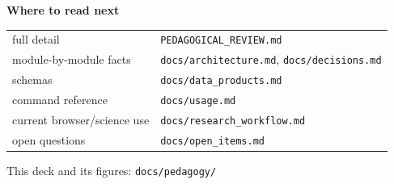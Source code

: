 \documentclass[aspectratio=169,11pt]{beamer}
\newcommand{\currevsec}{}
\newcommand{\revsec}[1]{\gdef\currevsec{#1}}
\begin{document}
\begin{frame}[plain]
  \revsec{}
  \centering
  \vspace{1.5cm}
  {\LARGE\color{jirblue}\textbf{Where to read next}}
  \vspace{0.6cm}

  \begin{tabular}{ll}
    full detail & \texttt{PEDAGOGICAL\_REVIEW.md} \\
    module-by-module facts & \texttt{docs/architecture.md}, \texttt{docs/decisions.md} \\
    schemas & \texttt{docs/data\_products.md} \\
    command reference & \texttt{docs/usage.md} \\
    current browser/science use & \texttt{docs/research\_workflow.md} \\
    open questions & \texttt{docs/open\_items.md} \\
  \end{tabular}\par
  \vspace{1cm}

  {\small\color{jirgray} This deck and its figures: \texttt{docs/pedagogy/}}
\end{frame}
\end{document}
